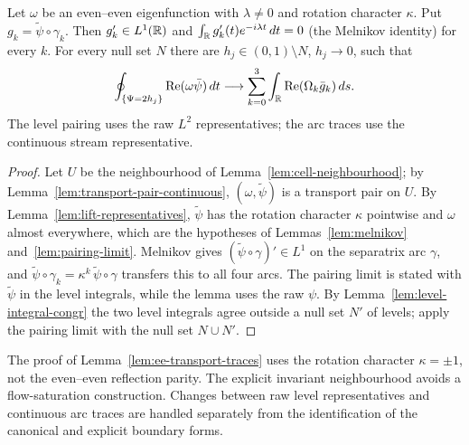 \begin{lemma}
\label{lem:ee-transport-traces}
\leanok
Let $\omega$ be an even--even eigenfunction with $\lambda\ne0$ and rotation character
$\kappa$. Put $g_k=\tilde\psi\circ\gamma_k$. Then $g_k'\in L^1(\mathbb{R})$ and
$\int_{\mathbb{R}} g_k'(t)e^{-i\lambda t}\,dt=0$ (the Melnikov identity) for every $k$.
For every null set $N$ there are $h_j\in(0,1)\setminus N$, $h_j\to0$, such that
\[
  \oint_{\{\Psi=2h_j\}}\operatorname{Re}(\omega\bar\psi)\,dt
   \longrightarrow\sum_{k=0}^3
      \int_{\mathbb{R}}\operatorname{Re}(\Omega_k\bar g_k)\,ds .
\]
The level pairing uses the raw $L^2$ representatives; the arc traces use the continuous
stream representative.
\end{lemma}

\begin{proof}
\leanok
Let $U$ be the neighbourhood of Lemma~\ref{lem:cell-neighbourhood}; by
Lemma~\ref{lem:transport-pair-continuous}, $(\omega,\tilde\psi)$ is a transport pair on $U$.
By Lemma~\ref{lem:lift-representatives}, $\tilde\psi$ has the rotation character
$\kappa$ pointwise and $\omega$ almost everywhere, which are the hypotheses of
Lemmas~\ref{lem:melnikov} and~\ref{lem:pairing-limit}. Melnikov gives
$(\tilde\psi\circ\gamma)'\in L^1$ on the separatrix arc $\gamma$, and
$\tilde\psi\circ\gamma_k=\kappa^k\,\tilde\psi\circ\gamma$ transfers this to all four arcs.
The pairing limit is stated with $\tilde\psi$ in the level integrals, while the
lemma uses the raw $\psi$. By Lemma~\ref{lem:level-integral-congr} the two level
integrals agree outside a null set $N'$ of levels; apply the pairing limit with the
null set $N\cup N'$.
\end{proof}

\begin{remark}
The proof of Lemma~\ref{lem:ee-transport-traces} uses the rotation character
$\kappa=\pm1$, not the even--even reflection parity. The explicit invariant
neighbourhood avoids a flow-saturation construction. Changes between raw
level representatives and continuous arc traces are handled separately
from the identification of the canonical and explicit boundary forms.
\end{remark}

